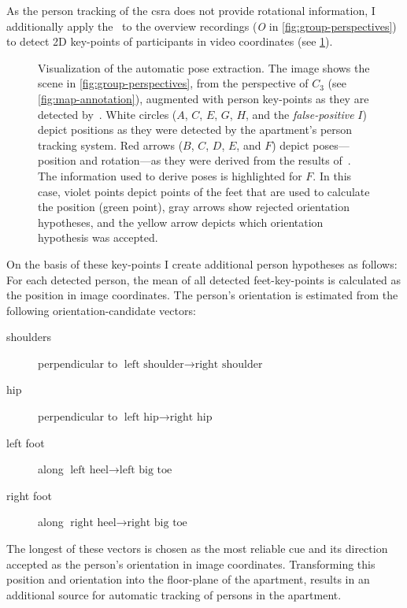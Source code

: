 As the person tracking of the \gls{csra} does not provide rotational information, I additionally apply the~ to the overview recordings (\emph{O} in \cref{fig:group-perspectives}) to detect 2D key-points of participants in video coordinates (see \cref{fig:group-openpose}).
\begin{figure}[htb]
    \centering
    \def\svgwidth{0.95\textwidth}
    \begin{footnotesize}
    
    \end{footnotesize}
    \caption[Automatic pose extraction.]{\label{fig:group-openpose}
    Visualization of the automatic pose extraction.
    The image shows the scene in \cref{fig:group-perspectives}, from the perspective of \(C_3\) (see \cref{fig:map-annotation}), augmented with person key-points as they are detected by~.
    White circles (\(A\), \(C\), \(E\), \(G\), \(H\), and the \emph{false-positive} \(I\)) depict positions as they were detected by the \gls{apartment}'s person tracking system.
    Red arrows (\(B\), \(C\), \(D\), \(E\), and \(F\)) depict poses---position and rotation---as they were derived from the results of~.
    The information used to derive poses is highlighted for \(F\).
    In this case, violet points depict points of the feet that are used to calculate the position (green point), gray arrows show rejected orientation hypotheses, and the yellow arrow depicts which orientation hypothesis was accepted.
    }
\end{figure}
On the basis of these key-points I create additional person hypotheses as follows:
For each detected person, the mean of all detected feet-key-points is calculated as the position in image coordinates.
The person's orientation is estimated from the following orientation-candidate vectors:
\begin{description}
    \item[shoulders] perpendicular to \(\text{left shoulder} \rightarrow \text{right shoulder}\)
    \item[hip] perpendicular to \(\text{left hip} \rightarrow \text{right hip}\)
    \item[left foot] along \(\text{left heel} \rightarrow \text{left big toe}\)
    \item[right foot] along \(\text{right heel} \rightarrow \text{right big toe}\)
\end{description}
The longest of these vectors is chosen as the most reliable cue and its direction accepted as the person's orientation in image coordinates.
Transforming this position and orientation into the floor-plane of the \gls{apartment}, results in an additional source for automatic tracking of persons in the \gls{apartment}.

